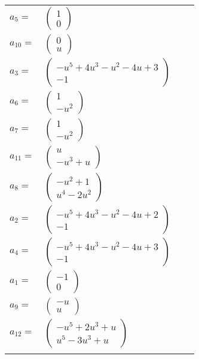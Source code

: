 \documentclass[1p]{elsarticle_modified}
\theoremstyle{definition}
\begin{document}
\begin{tabular}{m{7pt} m{180pt} m{7pt} m{180pt} }
\flushright $a_{5}=$&$\begin{pmatrix}1\\0\end{pmatrix}$ \\
\flushright $a_{10}=$&$\begin{pmatrix}0\\u\end{pmatrix}$ \\
\flushright $a_{3}=$&$\begin{pmatrix}- u^5+4 u^3- u^2-4 u+3\\-1\end{pmatrix}$ \\
\flushright $a_{6}=$&$\begin{pmatrix}1\\- u^2\end{pmatrix}$ \\
\flushright $a_{7}=$&$\begin{pmatrix}1\\- u^2\end{pmatrix}$ \\
\flushright $a_{11}=$&$\begin{pmatrix}u\\- u^3+u\end{pmatrix}$ \\
\flushright $a_{8}=$&$\begin{pmatrix}- u^2+1\\u^4-2 u^2\end{pmatrix}$ \\
\flushright $a_{2}=$&$\begin{pmatrix}- u^5+4 u^3- u^2-4 u+2\\-1\end{pmatrix}$ \\
\flushright $a_{4}=$&$\begin{pmatrix}- u^5+4 u^3- u^2-4 u+3\\-1\end{pmatrix}$ \\
\flushright $a_{1}=$&$\begin{pmatrix}-1\\0\end{pmatrix}$ \\
\flushright $a_{9}=$&$\begin{pmatrix}- u\\u\end{pmatrix}$ \\
\flushright $a_{12}=$&$\begin{pmatrix}- u^5+2 u^3+u\\u^5-3 u^3+u\end{pmatrix}$\\&\end{tabular}
\end{document}
